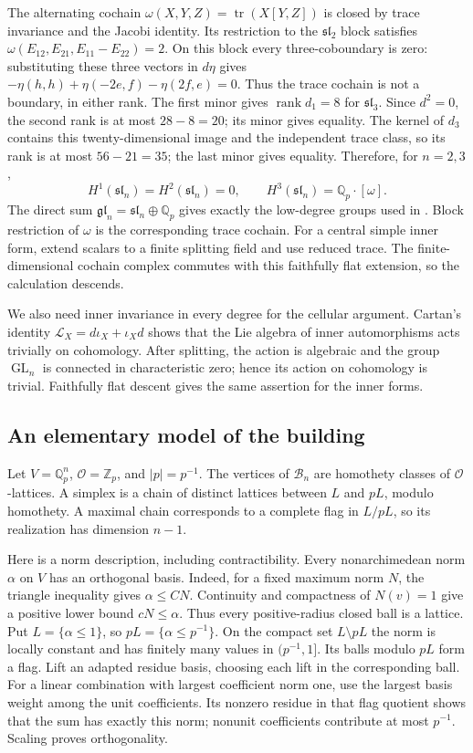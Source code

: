 \documentclass[11pt]{article}
\numberwithin{equation}{section}
\theoremstyle{definition}
\theoremstyle{remark}
\begin{document}
The alternating cochain $\omega(X,Y,Z)=\operatorname{tr}(X[Y,Z])$ is closed by
trace invariance and the Jacobi identity.  Its restriction to the
$\mathfrak{sl}_2$ block satisfies
$\omega(E_{12},E_{21},E_{11}-E_{22})=2$.  On this block every
three-coboundary is zero: substituting these three vectors in $d\eta$
gives
$-\eta(h,h)+\eta(-2e,f)-\eta(2f,e)=0$.
Thus the trace cochain is not a boundary, in either rank.
The first minor gives $\operatorname{rank} d_1=8$ for $\mathfrak{sl}_3$.
Since $d^2=0$, the second rank is at most $28-8=20$; its minor gives
equality.  The kernel of $d_3$ contains this twenty-dimensional image
and the independent trace class, so its rank is at most $56-21=35$;
the last minor gives equality.  Therefore, for $n=2,3$,
\[
 H^1(\mathfrak{sl}_n)=H^2(\mathfrak{sl}_n)=0,
 \qquad H^3(\mathfrak{sl}_n)=\mathbb Q_p\cdot[\omega].
\]
The direct sum $\mathfrak{gl}_n=\mathfrak{sl}_n\oplus\mathbb Q_p$ gives
exactly the low-degree groups used in .
Block restriction of $\omega$ is the corresponding trace cochain.
For a central simple inner form, extend scalars to a finite splitting
field and use reduced trace.  The finite-dimensional cochain complex
commutes with this faithfully flat extension, so the calculation descends.

We also need inner invariance in every degree for the cellular argument.
Cartan's identity $\mathcal L_X=d\iota_X+\iota_Xd$ shows that the Lie
algebra of inner automorphisms acts trivially on cohomology.  After
splitting, the action is algebraic and the group $\operatorname{GL}_n$ is connected
in characteristic zero; hence its action on cohomology is trivial.
Faithfully flat descent gives the same assertion for the inner forms.

\subsection{An elementary model of the building}
\label{app:building}

Let $V=\mathbb Q_p^n$, $\mathcal O=\mathbb Z_p$, and $|p|=p^{-1}$.  The vertices of
$\mathcal B_n$ are homothety classes of $\mathcal O$-lattices.  A simplex is a
chain of distinct lattices between $L$ and $pL$, modulo homothety.
A maximal chain corresponds to a complete flag in $L/pL$, so its
realization has dimension $n-1$.

Here is a norm description, including contractibility.  Every
nonarchimedean norm $\alpha$ on $V$ has an orthogonal basis.
Indeed, for a fixed maximum norm $N$, the triangle inequality gives
$\alpha\le CN$.  Continuity and compactness of $N(v)=1$ give a positive
lower bound $cN\le\alpha$.  Thus every positive-radius closed ball is
a lattice.  Put $L=\{\alpha\le1\}$, so $pL=\{\alpha\le p^{-1}\}$.
On the compact set $L\setminus pL$ the norm is locally constant and
has finitely many values in $(p^{-1},1]$.  Its balls modulo $pL$ form
a flag.  Lift an adapted residue basis, choosing each lift in the
corresponding ball.  For a linear combination with largest coefficient
norm one, use the largest basis weight among the unit coefficients.
Its nonzero residue in that flag quotient shows that the sum has
exactly this norm; nonunit coefficients contribute at most $p^{-1}$.  Scaling
proves orthogonality.
\end{document}
